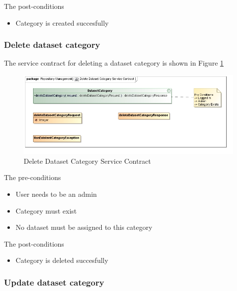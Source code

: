 The post-conditions
\begin{itemize}
  \item Category is created succesfully
\end{itemize}

\subsubsection {Delete dataset category}

The service contract for deleting a dataset category is shown in Figure \ref{fig:deleteDatasetCatService}
\begin{figure}[H]
  \begin{center}
  \includegraphics[scale=0.6]{../Diagrams and Charts/Test Data/Delete Dataset Category Service Contract.jpg}
  \caption{Delete Dataset Category Service Contract}
  \label{fig:deleteDatasetCatService}
  \end{center}
  
\end{figure}

The pre-conditions
\begin{itemize}
  \item User needs to be an admin
  \item Category must exist
  \item No dataset must be assigned to this category
\end{itemize}

The post-conditions
\begin{itemize}
  \item Category is deleted succesfully
\end{itemize}

\subsubsection {Update dataset category}

